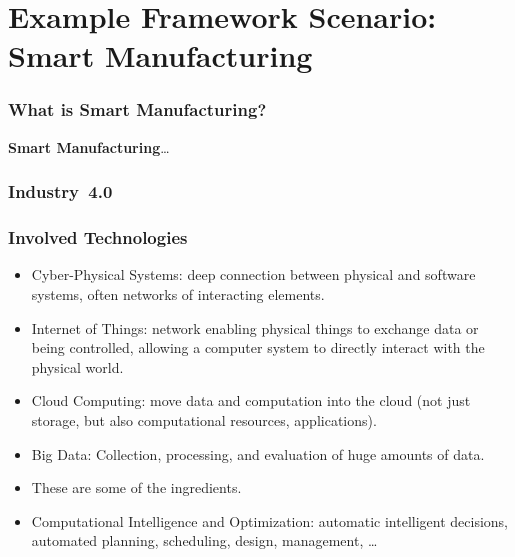 \documentclass[mathserif]{beamer}%
\begin{document}
\section{Example Framework Scenario: Smart Manufacturing}%
%
\begin{frame}[t]%
\frametitle{What is Smart Manufacturing?}%
\textbf{\large{Smart Manufacturing}}\cite{DEPBS2012SMMIADDP}\dots%
%
%
%
%
\end{frame}%
%
\begin{frame}[t]%
\frametitle{Industry~4.0\cite{HPO2016DPFI4S}}%
%
\end{frame}%
%
\begin{frame}[t]%
\frametitle{Involved Technologies}%
\begin{itemize}%
\item Cyber-Physical Systems: deep connection between physical and software systems, often networks of interacting elements.\cite{KM2015DTAAOCSAS}%
\item<2-> Internet of Things: network enabling physical things to exchange data or being controlled, allowing a computer system to directly interact with the physical world.\cite{B2014IOTSFOBF}%
\item<3-> Cloud Computing: move data and computation into the cloud (not just storage, but also computational resources, applications).\cite{L2008CCL1WICCAAITPDP}%
\item<4-> Big Data: Collection, processing, and evaluation of huge amounts of data.\cite{M2014BDT5VEMK}%
\item<5-> These are some of the ingredients.%
\item<8-> \alert{Computational Intelligence and Optimization}\cite{aitoa,WGOEB,CWM2012VOEAFRWA}: automatic intelligent decisions, automated planning, scheduling, design, management, \dots%
%
\end{itemize}%
\end{frame}%
\end{document}

